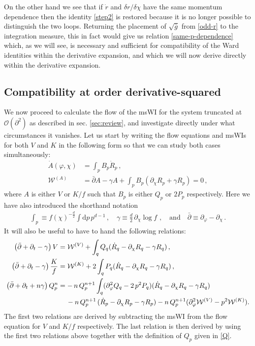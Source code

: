\documentclass[11pt]{book}
\newcommand{\dclnf}{\,\partial_\chi\! \log\! f \,}
\numberwithin{equation}{chapter}
\begin{document}
On the other hand we see that if $\dot{r}$ and $\delta r/\delta\chi$ have the same momentum
dependence then the identity \eqref{step2} is restored because it is no longer possible
to distinguish the two loops.
Returning the placement of $\sqrt{\bar{g}}$ from \eqref{odd-r} to the integration measure,
this in fact would give us relation \eqref{same-p-dependence} which, as we will see,
is necessary and sufficient for compatibility of the Ward identities within the derivative expansion,
and which we will now derive directly within the derivative expansion.


\subsection{Compatibility at order derivative-squared}\label{sec:compatibility-at-d2}

We now proceed to calculate the flow of the msWI for the system truncated
at $\mathcal{O}(\partial^2)$ as described in sec. \ref{sec:review},
and investigate directly under what circumstances it vanishes.
Let us start by writing the flow equations and msWIs for both $V$ and $K$ in the following form
so that we can study both cases simultaneously:
\begin{align}
	\label{flowA}
	\dot A(\varphi,\chi) &= \int_p B_p\dot R_p \,,\\
	\label{msWIA}
	\mathcal{W}^{(A)}&=\bar\partial A - \gamma A + \int_p B_p(\partial_\chi R_p + \gamma R_p)=0 \,,
\end{align}
where $A$ is either $V$ or $K/f$ such that $B_p$ is either $Q_p$ or $2 P_p$ respectively.
Here we have also introduced the shorthand notation
\begin{align}
  \label{gamma}
  \int_p \equiv f(\chi)^{-\frac{d}{2}} \int \mathrm dp \,p^{d-1} \,,
  \quad \gamma \equiv \frac{d}{2} \dclnf \,,
  \quad \text{and} \quad \bar\partial \equiv \partial_\varphi - \partial_\chi\,.
\end{align}
It will also be useful to have to hand the following relations:
\begin{align}
	\label{DV}
	\left( \bar \partial + \partial_t - \gamma \right) V &=
	\mathcal W^{(V)} + \int_q Q_q (\dot R_q - \partial_{\chi} R_q - \gamma R_q)\,,\\
	\label{DK}
	\left( \bar \partial + \partial_t - \gamma \right) \frac{K}{f} &=
	\mathcal W^{(K)} + 2 \int_q P_q (\dot R_q - \partial_{\chi} R_q - \gamma R_q)\,,\\
	\label{DQ}
	\left( \bar \partial + \partial_t + n \gamma \right) Q_p^n &=
	- \, n \, Q_p^{n+1} \int_q (\partial_{\varphi}^2 Q_q - 2 \, p^2 P_q)(\dot R_q - \partial_{\chi} R_q
	 - \gamma R_q)\nonumber\\
   &\hspace{4.2mm}-n \, Q_p^{n+1} \, (\dot R_p - \partial_{\chi} R_p - \gamma R_p)
	-n \, Q_p^{n+1} (\partial_{\varphi}^2 \mathcal W^{(V)} - p^2 \mathcal W^{(K)}).
\end{align}
The first two relations are derived by subtracting the msWI from the flow equation for
$V$ and $K/f$ respectively. The last relation is then derived by using the first two relations
above together with the definition of $Q_p$ given in \eqref{Q}.
\end{document}
